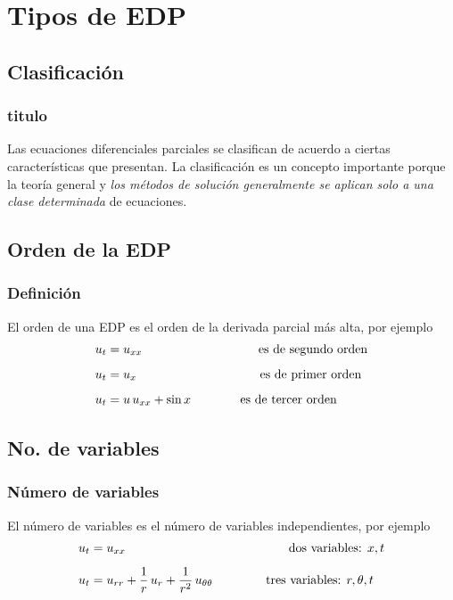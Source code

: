 \section{Tipos de EDP}
\subsection{Clasificación}
\begin{frame}
\frametitle{titulo}
Las ecuaciones diferenciales parciales se clasifican de acuerdo a ciertas características que presentan. La clasificación es un concepto importante porque la teoría general y \emph{los métodos de solución generalmente se aplican solo a una clase determinada} de ecuaciones.
\end{frame}
\begin{frame}
\subsection*{Orden de la EDP}
\frametitle{Definición}
El orden de una EDP es el orden de la derivada parcial más alta, por ejemplo
\begin{align*}
u_{t} &= u_{xx} \hspace{3.3cm} \mbox{es de segundo orden} \\[0.5em]
u_{t} &= u_{x} \hspace{3.5cm} \mbox{es de primer orden} \\[0.5em]
u_{t} &= u \, u_{xx} + \sin x \hspace{1.4cm} \mbox{es de tercer orden}
\end{align*}
\end{frame}
\subsection*{No. de variables}
\begin{frame}
\frametitle{Número de variables}
El número de variables es el número de variables independientes, por ejemplo
\begin{align*}
u_{t} &= u_{xx} \hspace{3cm} \hspace{1.61cm} \mbox{dos variables: } x, t \\[0.5em] 
u_{t} &= u_{rr} + \dfrac{1}{r} \, u_{r} + \dfrac{1}{r^{2}} \, u_{\theta \theta} \hspace{1.5cm} \mbox{tres variables: } r, \theta, t
\end{align*}
\end{frame}
